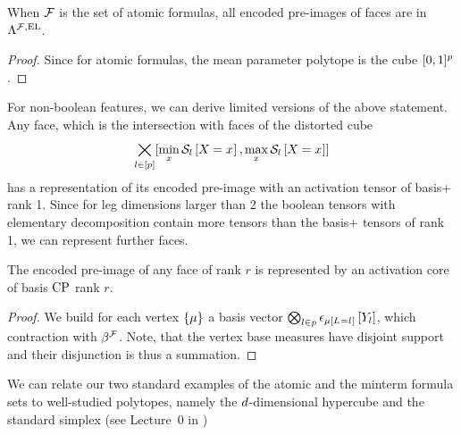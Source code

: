 \begin{corollary}
	When $\mathcal{F}$ is the set of atomic formulas, all encoded pre-images of faces are in $\Lambda^{\mathcal{F},\mathrm{EL}}$.
\end{corollary}
\begin{proof}
	Since for atomic formulas, the mean parameter polytope is the cube $[0,1]^p$.
\end{proof}

For non-boolean features, we can derive limited versions of the above statement.
Any face, which is the intersection with faces of the distorted cube
\begin{align*}
	\bigtimes_{l\in[p]} [\min_{x}\mathcal{S}_{l}\left[X_{}=x_{}\right],\max_{x}\mathcal{S}_{l}\left[X_{}=x_{}\right]]
\end{align*}
has a representation of its encoded pre-image with an activation tensor of basis+ rank 1.
Since for leg dimensions larger than 2 the boolean tensors with elementary decomposition contain more tensors than the basis+ tensors of rank 1, we can represent further faces.



%
\begin{theorem}
	The encoded pre-image of any face of rank $r$ is represented by an activation core of basis $\mathrm{CP}$ rank $r$.
\end{theorem}
\begin{proof}
	We build for each vertex $\{\mu\}$ a basis vector $\bigotimes_{l\in p}\epsilon_{\mu\left[L_{}=l_{}\right]}\left[Y_{l}\right]$, which contraction with $\beta^{\mathcal{F}}$.
	Note, that the vertex base measures have disjoint support and their disjunction is thus a summation.
\end{proof}





We can relate our two standard examples of the atomic and the minterm formula sets to well-studied polytopes, namely the $d$-dimensional hypercube and the standard simplex (see Lecture~0 in \cite{ziegler_lectures_2013} )

